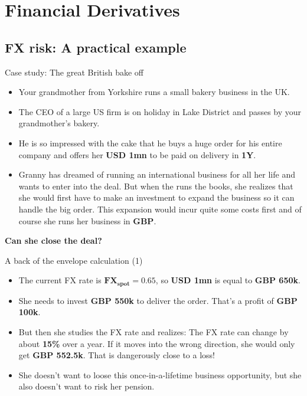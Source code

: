 \documentclass[t]{beamer}
\begin{document}
\begin{frame}
	\tableofcontents
\end{frame}


\section{Financial Derivatives}


\subsection{FX risk: A practical example}

\begin{frame}{Case study: The great British bake off}
	\begin{itemize}
		\item
			Your grandmother from Yorkshire runs a small bakery business in the UK.
		\item
			The CEO of a large US firm is on holiday in Lake District and passes by your grandmother's bakery. 
		\item
			He is so impressed with the cake that he buys a huge order for his entire company and offers her \textbf{USD 1mn} to be paid on delivery in \textbf{1Y}.
		\item
			Granny has dreamed of running an international business for all her life and wants to enter into the deal.
			But when the runs the books, she realizes that she would first have to make an investment to expand the business so it can handle the big order. 
			This expansion would incur quite some costs first and of course she runs her business in \textbf{GBP}.
	\end{itemize}
	
	\begin{center}
		\textbf{Can she close the deal?}
	\end{center}
	
\end{frame}

\begin{frame}{A back of the envelope calculation (1)}
	\begin{itemize}
		\item 
			The current FX rate is $\mathbf{FX_{spot}=0.65}$, so \textbf{USD 1mn} is equal to \textbf{GBP 650k}.
		\item
			She needs to invest \textbf{GBP 550k} to deliver the order. That's a profit of \textbf{GBP 100k}.
		\item
			But then she studies the FX rate and realizes: The FX rate can change by about \textbf{15\%} over a year. If it moves into the wrong direction, she would only get \textbf{GBP 552.5k}. That is dangerously close to a loss!
		\item
			She doesn't want to loose this once-in-a-lifetime business opportunity, but she also doesn't want to risk her pension.			
	\end{itemize}
\end{frame}
\end{document}
